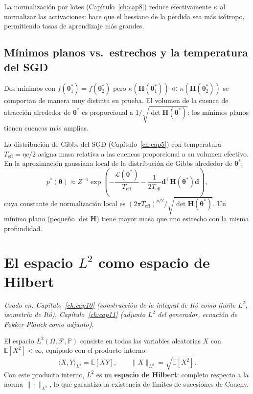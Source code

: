 La normalización por lotes (Capítulo~\ref{ch:cap8}) reduce efectivamente $\kappa$
al normalizar las activaciones: hace que el hessiano de la pérdida sea más
isótropo, permitiendo tasas de aprendizaje más grandes.

\subsection{Mínimos planos vs.\ estrechos y la temperatura del SGD}
\label{subsec:ap_minimos_planos}

Dos mínimos con $f(\bm{\theta}_1^*) = f(\bm{\theta}_2^*)$ pero $\kappa(\bm{H}
(\bm{\theta}_1^*)) \ll \kappa(\bm{H}(\bm{\theta}_2^*))$ se comportan de manera
muy distinta en prueba. El volumen de la cuenca de atracción alrededor de
$\bm{\theta}^*$ es proporcional a $1/\sqrt{\det\bm{H}(\bm{\theta}^*)}$: los
mínimos planos tienen cuencas más amplias.

La distribución de Gibbs del SGD (Capítulo~\ref{ch:cap5}) con temperatura
$T_{\mathrm{eff}} = \eta c/2$ asigna masa relativa a las cuencas proporcional
a su volumen efectivo. En la aproximación gaussiana local de la distribución
de Gibbs alrededor de $\bm{\theta}^*$:
\[
  p^*(\bm{\theta})\approx Z^{-1}\exp\!\left(-\frac{\mathcal{L}(\bm{\theta}^*)}{T_{\mathrm{eff}}}
  - \frac{1}{2T_{\mathrm{eff}}}\bm{d}^\top\bm{H}(\bm{\theta}^*)\bm{d}\right),
\]
cuya constante de normalización local es $(2\pi T_{\mathrm{eff}})^{p/2}/
\sqrt{\det\bm{H}(\bm{\theta}^*)}$. Un mínimo plano (pequeño $\det\bm{H}$)
tiene mayor masa que uno estrecho con la misma profundidad.

\section{El espacio $L^2$ como espacio de Hilbert}
\label{sec:ap_l2}

\textit{Usado en: Capítulo~\ref{ch:cap10} (construcción de la integral de Itô
como límite $L^2$, isometría de Itô), Capítulo~\ref{ch:cap11} (adjunto $L^2$
del generador, ecuación de Fokker-Planck como adjunto).}

\medskip
El espacio $L^2(\Omega, \mathcal{F}, \mathbb{P})$ consiste en todas las
variables aleatorias $X$ con $\mathbb{E}[X^2] < \infty$, equipado con el
producto interno:
\begin{equation}
  \langle X, Y\rangle_{L^2} = \mathbb{E}[XY],
  \qquad
  \|X\|_{L^2} = \sqrt{\mathbb{E}[X^2]}.
  \label{eq:ap_l2}
\end{equation}
Con este producto interno, $L^2$ es un \textbf{espacio de Hilbert}: completo
respecto a la norma $\|\cdot\|_{L^2}$, lo que garantiza la existencia de
límites de sucesiones de Cauchy.

